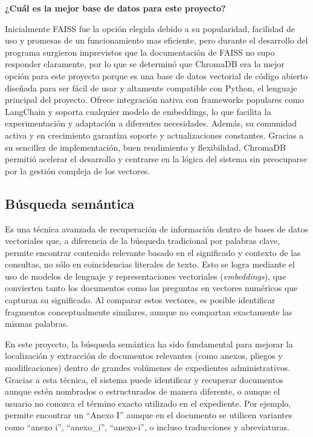 \documentclass{article}
\begin{document}
\textbf{¿Cuál es la mejor base de datos para este proyecto?}

Inicialmente FAISS fue la opción elegida debido a su popularidad, facilidad de uso y promesas de un funcionamiento mas eficiente, pero durante el desarrollo del programa surgieron imprevistos que la documentación de FAISS no supo responder claramente, por lo que se determinó que
ChromaDB era la mejor opción para este proyecto porque es una base de datos vectorial de código abierto diseñada para ser fácil de usar y altamente compatible con Python, el lenguaje principal del proyecto. Ofrece integración nativa con frameworks populares como LangChain y soporta cualquier modelo de embeddings, lo que facilita la experimentación y adaptación a diferentes necesidades. Además, su comunidad activa y en crecimiento garantiza soporte y actualizaciones constantes. Gracias a su sencillez de implementación, buen rendimiento y flexibilidad, ChromaDB permitió acelerar el desarrollo y centrarse en la lógica del sistema sin preocuparse por la gestión compleja de los vectores.

\subsection{Búsqueda semántica}
 Es una técnica avanzada de recuperación de información dentro de bases de datos vectoriales que, a diferencia de la búsqueda tradicional por palabras clave, permite encontrar contenido relevante basado en el significado y contexto de las consultas, no sólo en coincidencias literales de texto. Esto se logra mediante el uso de modelos de lenguaje y representaciones vectoriales (\textit{embeddings}), que convierten tanto los documentos como las preguntas en vectores numéricos que capturan su significado. Al comparar estos vectores, es posible identificar fragmentos conceptualmente similares, aunque no compartan exactamente las mismas palabras.

En este proyecto, la búsqueda semántica ha sido fundamental para mejorar la localización y extracción de documentos relevantes (como anexos, pliegos y modificaciones) dentro de grandes volúmenes de expedientes administrativos. Gracias a esta técnica, el sistema puede identificar y recuperar documentos aunque estén nombrados o estructurados de manera diferente, o aunque el usuario no conozca el término exacto utilizado en el expediente. Por ejemplo, permite encontrar un ``Anexo I'' aunque en el documento se utilicen variantes como ``anexo i'', ``anexo\_i'', ``anexo-i'', o incluso traducciones y abreviaturas.
\end{document}
